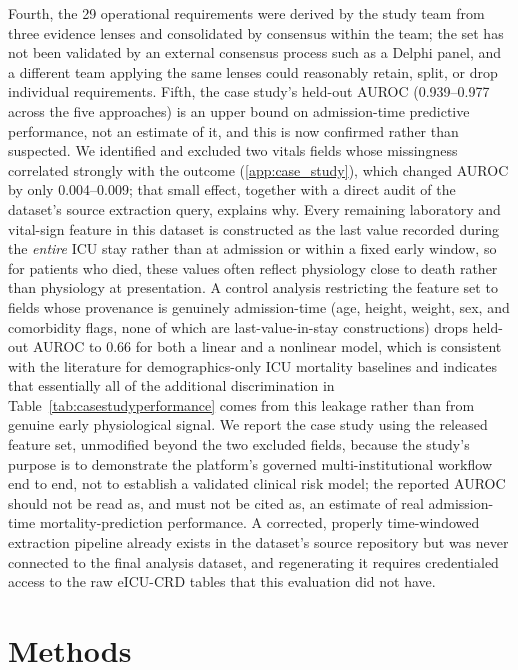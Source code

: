 \documentclass[preprint,5p, 10pt, times]{elsarticle}
\begin{document}
%
Fourth, the 29 operational requirements were derived by the study team from three evidence lenses and consolidated by consensus within the team; the set has not been validated by an external consensus process such as a Delphi panel, and a different team applying the same lenses could reasonably retain, split, or drop individual requirements.
%
Fifth, the case study's held-out AUROC (0.939--0.977 across the five approaches) is an upper bound on admission-time predictive performance, not an estimate of it, and this is now confirmed rather than suspected. We identified and excluded two vitals fields whose missingness correlated strongly with the outcome (\ref{app:case_study}), which changed AUROC by only 0.004--0.009; that small effect, together with a direct audit of the dataset's source extraction query, explains why. Every remaining laboratory and vital-sign feature in this dataset is constructed as the last value recorded during the \textit{entire} ICU stay rather than at admission or within a fixed early window, so for patients who died, these values often reflect physiology close to death rather than physiology at presentation. A control analysis restricting the feature set to fields whose provenance is genuinely admission-time (age, height, weight, sex, and comorbidity flags, none of which are last-value-in-stay constructions) drops held-out AUROC to 0.66 for both a linear and a nonlinear model, which is consistent with the literature for demographics-only ICU mortality baselines and indicates that essentially all of the additional discrimination in Table~\ref{tab:casestudyperformance} comes from this leakage rather than from genuine early physiological signal. We report the case study using the released feature set, unmodified beyond the two excluded fields, because the study's purpose is to demonstrate the platform's governed multi-institutional workflow end to end, not to establish a validated clinical risk model; the reported AUROC should not be read as, and must not be cited as, an estimate of real admission-time mortality-prediction performance. A corrected, properly time-windowed extraction pipeline already exists in the dataset's source repository but was never connected to the final analysis dataset, and regenerating it requires credentialed access to the raw eICU-CRD tables that this evaluation did not have.


\newpage
\section*{Methods}
\end{document}
